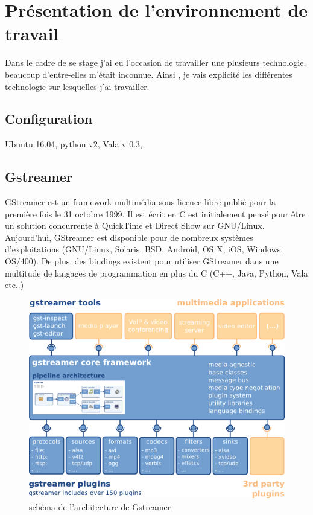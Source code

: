 \chapter{Présentation de l'environnement de travail}
Dans le cadre de se stage j'ai eu l'occasion de travailler une plusieurs technologie, beaucoup d'entre-elles m'était inconnue. Ainsi , je vais explicité les différentes technologie sur lesquelles j'ai travailler.
\section{Configuration}
Ubuntu 16.04, python v2, Vala v 0.3,

\section{Gstreamer}
\label{gstreamer}



GStreamer est un framework multimédia sous licence libre publié pour la première fois le 31 octobre 1999. Il est écrit en C est initialement pensé pour être un solution concurrente à QuickTime et Direct Show sur GNU/Linux. Aujourd'hui, GStreamer est disponible pour de nombreux systèmes d'exploitations (GNU/Linux, Solaris, BSD, Android, OS X, iOS, Windows, OS/400). De plus, des bindings existent pour utiliser GStreamer dans une multitude de langages de programmation en plus du C (C++, Java, Python, Vala etc..)
\begin{figure}[!h]
  \centering
  \includegraphics[scale=0.7]{figures/gstreamer-overview}
  \caption{schéma de l'architecture de Gstreamer}
\end{figure}



